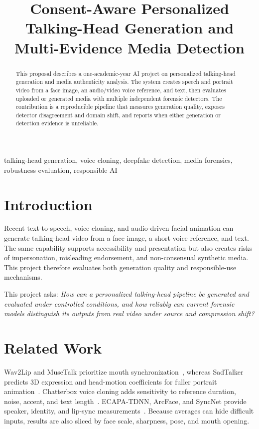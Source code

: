 \documentclass[10pt,conference]{IEEEtran}
\title{Consent-Aware Personalized Talking-Head Generation and Multi-Evidence Media Detection}
\author{\IEEEauthorblockN{Xinran Yang}
\IEEEauthorblockA{AI Project Proposal Draft}}
\begin{document}
\maketitle

\begin{abstract}
This proposal describes a one-academic-year AI project on personalized talking-head generation and media authenticity analysis. The system creates speech and portrait video from a face image, an audio/video voice reference, and text, then evaluates uploaded or generated media with multiple independent forensic detectors. The contribution is a reproducible pipeline that measures generation quality, exposes detector disagreement and domain shift, and reports when either generation or detection evidence is unreliable.
\end{abstract}

\begin{IEEEkeywords}
talking-head generation, voice cloning, deepfake detection, media forensics, robustness evaluation, responsible AI
\end{IEEEkeywords}

\section{Introduction}
Recent text-to-speech, voice cloning, and audio-driven facial animation can generate talking-head video from a face image, a short voice reference, and text. The same capability supports accessibility and presentation but also creates risks of impersonation, misleading endorsement, and non-consensual synthetic media. This project therefore evaluates both generation quality and responsible-use mechanisms.

This project asks: \emph{How can a personalized talking-head pipeline be generated and evaluated under controlled conditions, and how reliably can current forensic models distinguish its outputs from real video under source and compression shift?}

\section{Related Work}
Wav2Lip and MuseTalk prioritize mouth synchronization~\cite{wav2lip,musetalk}, whereas SadTalker predicts 3D expression and head-motion coefficients for fuller portrait animation~\cite{sadtalker}. Chatterbox voice cloning adds sensitivity to reference duration, noise, accent, and text length~\cite{chatterbox}. ECAPA-TDNN, ArcFace, and SyncNet provide speaker, identity, and lip-sync measurements~\cite{ecapa,arcface,syncnet}. Because averages can hide difficult inputs, results are also sliced by face scale, sharpness, pose, and mouth opening.
\end{document}
